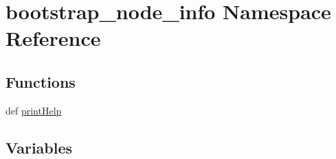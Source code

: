 \hypertarget{namespacebootstrap__node__info}{\section{bootstrap\+\_\+node\+\_\+info Namespace Reference}
\label{namespacebootstrap__node__info}
}
\subsection*{Functions}
\begin{DoxyCompactItemize}
\item 
def \hyperlink{namespacebootstrap__node__info_acc2953521d81421d476f7960b21fea2a}{print\+Help}
\end{DoxyCompactItemize}
\subsection*{Variables}

